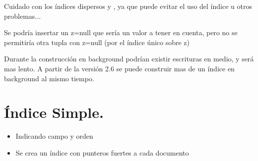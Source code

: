 \documentclass[a4paper,10pt,english]{sphinxmanual}
\begin{document}
Cuidado con los índices dispersos y , ya que puede evitar el uso del índice u otros problemas...

Se podría insertar un z=null que sería un valor a tener en cuenta, pero no se permitiría otra tupla con z=null (por el índice único sobre z)

Durante la construcción en background podrían existir escrituras en medio, y será mas lento. A partir de la versión 2.6 se puede construir mas de un índice en background al mismo tiempo.


\section{Índice Simple.}
\label{contents/optimizing:indice-simple}\begin{itemize}
\item {} 
Indicando campo y orden

\item {} 
Se crea un índice con punteros fuertes a cada documento

\end{itemize}
\end{document}
